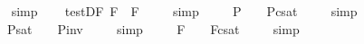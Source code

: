 \begin{isabellebody}
\isadelimproof
\ %
\endisadelimproof
%
\isatagproof
{}\isamarkupfalse%
\ simp\ \isamarkupfalse%
%
\endisatagproof
{\isafoldproof}%
%
\isadelimproof
%
\endisadelimproof
\isanewline
\ \isamarkupfalse%
\ test{\isacharunderscore}D{\isacharunderscore}F{\isacharcolon}\ {\isachardoublequoteopen}{\isacharbrackleft}\isactrlbold {\isasymdiamond}\isactrlbold {\isasymbox}{\isasymphi}\isactrlsup F\ \isactrlbold {\isasymrightarrow}\ \isactrlbold {\isasymbox}{\isasymphi}\isactrlsup F{\isacharbrackright}\ {\isacharequal}\ {\isasymtop}{\isachardoublequoteclose}%
\isadelimproof
\ %
\endisadelimproof
%
\isatagproof
{}\isamarkupfalse%
\ simp\ \isamarkupfalse%
%
\endisatagproof
{\isafoldproof}%
%
\isadelimproof
%
\endisadelimproof
%
\isamarkuptrue%
\ \isamarkupfalse%
\ \ {\isachardoublequoteopen}{\isacharbrackleft}{\isasymphi}\isactrlsup P{\isacharbrackright}\ {\isacharequal}\ {\isasymtop}\ {\isasymlongleftrightarrow}\ {\isacharbrackleft}{\isasymphi}\isactrlsup P{\isacharbrackright}\isactrlsup c\isactrlsup s\isactrlsup a\isactrlsup t\ {\isacharequal}\ {\isasymbottom}{\isachardoublequoteclose}%
\isadelimproof
\ %
\endisadelimproof
%
\isatagproof
{}\isamarkupfalse%
\ simp\ \isamarkupfalse%
%
\endisatagproof
{\isafoldproof}%
%
\isadelimproof
%
\endisadelimproof
\isanewline
\ \isamarkupfalse%
\ \ {\isachardoublequoteopen}{\isacharbrackleft}{\isasymphi}\isactrlsup P{\isacharbrackright}\isactrlsup s\isactrlsup a\isactrlsup t\ {\isacharequal}\ {\isasymtop}\ {\isasymlongleftrightarrow}\ {\isacharbrackleft}{\isasymphi}\isactrlsup P{\isacharbrackright}\isactrlsup i\isactrlsup n\isactrlsup v\ {\isacharequal}\ {\isasymbottom}{\isachardoublequoteclose}%
\isadelimproof
\ %
\endisadelimproof
%
\isatagproof
{}\isamarkupfalse%
\ simp\ \isamarkupfalse%
%
\endisatagproof
{\isafoldproof}%
%
\isadelimproof
%
\endisadelimproof
\isanewline
\ \isamarkupfalse%
\ \ {\isachardoublequoteopen}{\isacharbrackleft}{\isasymphi}\isactrlsup F{\isacharbrackright}\ {\isacharequal}\ {\isasymtop}\ {\isasymlongleftrightarrow}\ {\isacharbrackleft}{\isasymphi}\isactrlsup F{\isacharbrackright}\isactrlsup c\isactrlsup s\isactrlsup a\isactrlsup t\ {\isacharequal}\ {\isasymbottom}{\isachardoublequoteclose}%
\isadelimproof
\ %
\endisadelimproof
%
\isatagproof
{}\isamarkupfalse%
\ simp\ \isamarkupfalse%
%
\endisatagproof
{\isafoldproof}%

\end{isabellebody}
